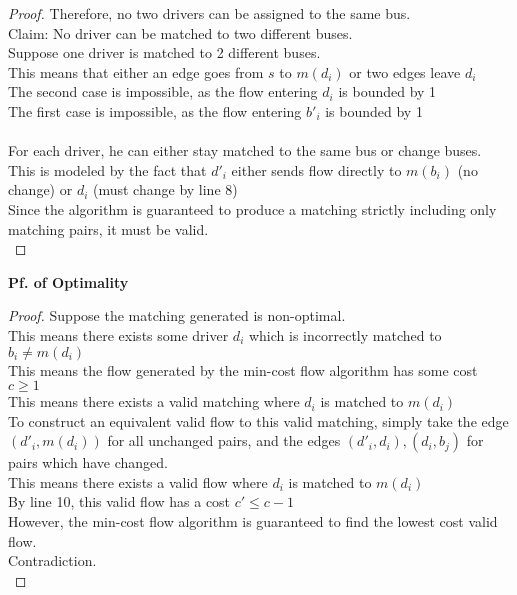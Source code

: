 \begin{problem}
\begin{proof}
        Therefore, no two drivers can be assigned to the same bus. \\
        Claim: No driver can be matched to two different buses. \\
        Suppose one driver is matched to 2 different buses. \\
        This means that either an edge goes from $s$ to $m(d_i)$ or two edges leave $d_i$ \\
        The second case is impossible, as the flow entering $d_i$ is bounded by 1 \\
        The first case is impossible, as the flow entering $b'_i$ is bounded by 1 \\\\
        For each driver, he can either stay matched to the same bus or change buses. \\
        This is modeled by the fact that $d'_i$ either sends flow directly to $m(b_i)$ (no change) or $d_i$ (must change by line 8) \\
        Since the algorithm is guaranteed to produce a matching strictly including only matching pairs, it must be valid. \\
    \end{proof}
    \noindent
    \textbf{Pf. of Optimality}
    \begin{proof}
        Suppose the matching generated is non-optimal. \\
        This means there exists some driver $d_i$ which is incorrectly matched to $b_i \neq m(d_i)$ \\
        This means the flow generated by the min-cost flow algorithm has some cost $c \geq 1$ \\
        This means there exists a valid matching where $d_i$ is matched to $m(d_i)$ \\
        To construct an equivalent valid flow to this valid matching, simply take the edge $(d'_i, m(d_i))$ for all unchanged pairs,
        and the edges $(d'_i, d_i), (d_i, b_j)$ for pairs which have changed. \\
        This means there exists a valid flow where $d_i$ is matched to $m(d_i)$ \\
        By line 10, this valid flow has a cost $c' \leq c - 1$ \\
        However, the min-cost flow algorithm is guaranteed to find the lowest cost valid flow. \\
        Contradiction. \\
    \end{proof}

\end{problem}
